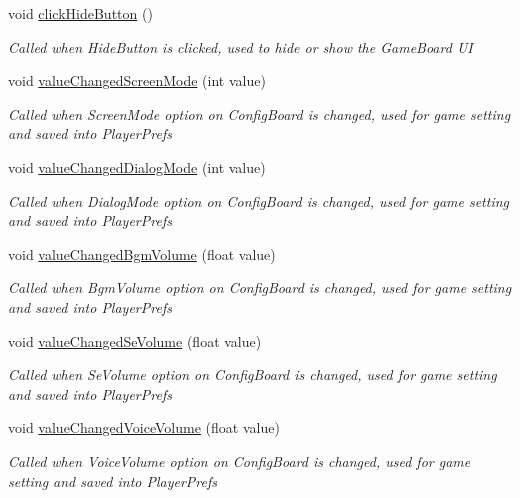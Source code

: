 \begin{DoxyCompactItemize}
void \hyperlink{class_world_control_a77bee2bd9d38af266eda9028726a8526}{click\+Hide\+Button} ()
\begin{DoxyCompactList}\small\item\em Called when Hide\+Button is clicked, used to hide or show the Game\+Board UI \end{DoxyCompactList}\item 
void \hyperlink{class_world_control_a7e52bfc69634bd4d6ca536f93d6a1d8d}{value\+Changed\+Screen\+Mode} (int value)
\begin{DoxyCompactList}\small\item\em Called when Screen\+Mode option on Config\+Board is changed, used for game setting and saved into Player\+Prefs \end{DoxyCompactList}\item 
void \hyperlink{class_world_control_a0263e4517ff05cc485dc03b52b0ea84d}{value\+Changed\+Dialog\+Mode} (int value)
\begin{DoxyCompactList}\small\item\em Called when Dialog\+Mode option on Config\+Board is changed, used for game setting and saved into Player\+Prefs \end{DoxyCompactList}\item 
void \hyperlink{class_world_control_ac21379113088e81f889b78e63d90e3d6}{value\+Changed\+Bgm\+Volume} (float value)
\begin{DoxyCompactList}\small\item\em Called when Bgm\+Volume option on Config\+Board is changed, used for game setting and saved into Player\+Prefs \end{DoxyCompactList}\item 
void \hyperlink{class_world_control_a2577abdc948ee558066878b563c2bfc7}{value\+Changed\+Se\+Volume} (float value)
\begin{DoxyCompactList}\small\item\em Called when Se\+Volume option on Config\+Board is changed, used for game setting and saved into Player\+Prefs \end{DoxyCompactList}\item 
void \hyperlink{class_world_control_abcd92ceb74acb556c889ce652219312c}{value\+Changed\+Voice\+Volume} (float value)
\begin{DoxyCompactList}\small\item\em Called when Voice\+Volume option on Config\+Board is changed, used for game setting and saved into Player\+Prefs \end{DoxyCompactList}\item 

\end{DoxyCompactItemize}
